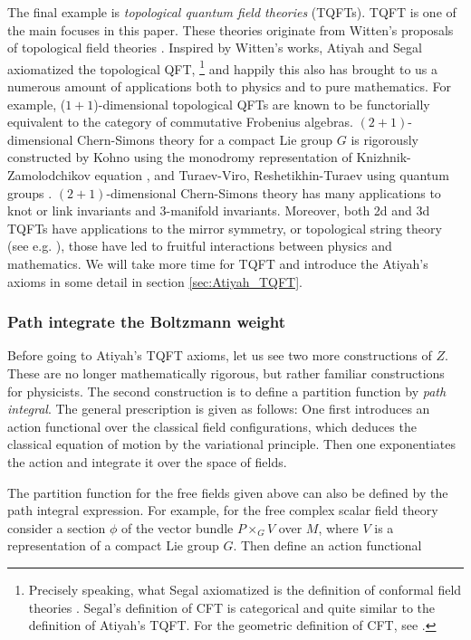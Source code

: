 The final example is \emph{topological quantum field theories} (TQFTs).
TQFT is one of the main focuses in this paper. These theories
originate from Witten's proposals of topological field theories
\cite{Witten:1988xj, Witten:1988ze, Witten:1988hf}. Inspired by Witten's
works, Atiyah and Segal axiomatized the topological QFT,%
%
\footnote{Precisely speaking, what Segal axiomatized is the definition of conformal
field theories \cite{Segal:2002ei}. Segal's definition of CFT is categorical
and quite similar to the definition of Atiyah's TQFT.
For the geometric definition of CFT, see \cite{Friedan:1986ua}. }
%
and happily this also has brought to us a numerous amount of applications
both to physics and to pure mathematics. For example, ($1+1$)-dimensional
topological QFTs are known to be functorially equivalent to the category of commutative
Frobenius algebras. $(2+1)$-dimensional Chern-Simons theory for a
compact Lie group $G$ is rigorously constructed by Kohno \cite{MR1167165} using
the monodromy representation of Knizhnik-Zamolodchikov equation \cite{Knizhnik:1984nr},
and Turaev-Viro, Reshetikhin-Turaev using quantum groups \cite{Turaev:1992hq, Reshetikhin:1991tc}.
$(2+1)$-dimensional Chern-Simons theory has many
applications to knot or link invariants and $3$-manifold invariants.
Moreover, both 2d and 3d TQFTs have applications to the mirror symmetry,
or topological string theory (see e.g. \cite{Hori:2003ic}), those have led to fruitful interactions
between physics and mathematics. We will take more time for TQFT and
introduce the Atiyah's axioms in some detail in section \ref{sec:Atiyah_TQFT}.

\subsubsection*{Path integrate the Boltzmann weight}

Before going to Atiyah's TQFT axioms, let us see two more constructions
of $Z$. These are no longer mathematically rigorous, but rather familiar
constructions for physicists. The second construction is to define
a partition function by \emph{path integral}. The general prescription
is given as follows: One first introduces an action functional over
the classical field configurations, which deduces the classical equation
of motion by the variational principle. Then one exponentiates the
action and integrate it over the space of fields.

The partition function for the free fields given above can also be
defined by the path integral expression. For example, for the free
complex scalar field theory consider a section $\phi$ of the vector
bundle $P\times_{G}V$ over $M$, where $V$ is a representation of
a compact Lie group $G$. Then define an action functional

